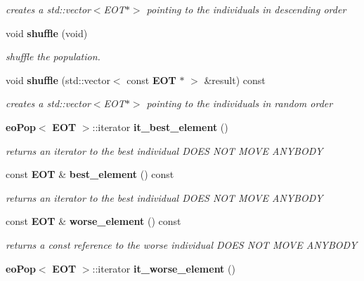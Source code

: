 \begin{CompactItemize}
\begin{CompactList}\small\item\em creates a std::vector$<$EOT$\ast$$>$ pointing to the individuals in descending order \item\end{CompactList}\item 
void {\bf shuffle} (void)
\begin{CompactList}\small\item\em shuffle the population. \item\end{CompactList}\item 
void {\bf shuffle} (std::vector$<$ const {\bf EOT} $\ast$ $>$ \&result) const \label{classeo_pop_a8}

\begin{CompactList}\small\item\em creates a std::vector$<$EOT$\ast$$>$ pointing to the individuals in random order \item\end{CompactList}\item 
{\bf eo\-Pop}$<$ {\bf EOT} $>$::iterator {\bf it\_\-best\_\-element} ()\label{classeo_pop_a9}

\begin{CompactList}\small\item\em returns an iterator to the best individual DOES NOT MOVE ANYBODY \item\end{CompactList}\item 
const {\bf EOT} \& {\bf best\_\-element} () const \label{classeo_pop_a10}

\begin{CompactList}\small\item\em returns an iterator to the best individual DOES NOT MOVE ANYBODY \item\end{CompactList}\item 
const {\bf EOT} \& {\bf worse\_\-element} () const \label{classeo_pop_a11}

\begin{CompactList}\small\item\em returns a const reference to the worse individual DOES NOT MOVE ANYBODY \item\end{CompactList}\item 
{\bf eo\-Pop}$<$ {\bf EOT} $>$::iterator {\bf it\_\-worse\_\-element} ()\label{classeo_pop_a12}


\end{CompactItemize}
